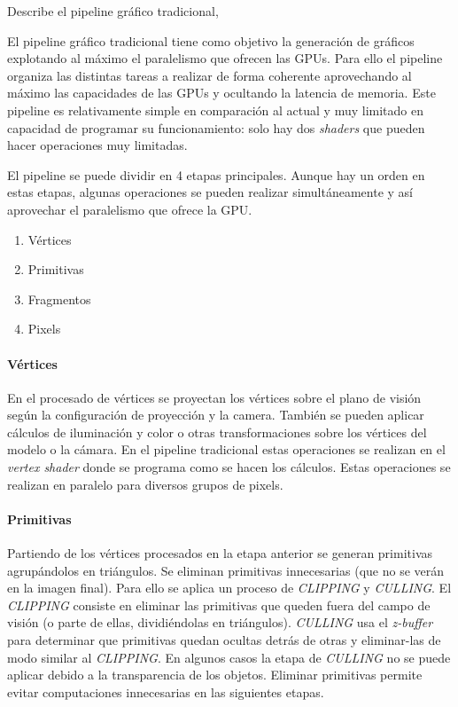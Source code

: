 \begin{pregunta}{Describe el pipeline gráfico tradicional}\sep{}

El pipeline gráfico tradicional tiene como objetivo la generación de gráficos
explotando al máximo el paralelismo que ofrecen las GPUs. Para ello el pipeline
organiza las distintas tareas a realizar de forma coherente aprovechando al
máximo las capacidades de las GPUs y ocultando la latencia de memoria. Este
pipeline es relativamente simple en comparación al actual y muy limitado en
capacidad de programar su funcionamiento: solo hay dos \emph{shaders} que pueden
hacer operaciones muy limitadas.

El pipeline se puede dividir en 4 etapas principales. Aunque hay un orden en
estas etapas, algunas operaciones se pueden realizar simultáneamente y así
aprovechar el paralelismo que ofrece la GPU.

\begin{enumerate}
    \item Vértices
    \item Primitivas
    \item Fragmentos
    \item Pixels
\end{enumerate}

\paragraph{Vértices} En el procesado de vértices se proyectan los vértices sobre
el plano de visión según la configuración de proyección y la camera. También se
pueden aplicar cálculos de iluminación y color o otras transformaciones
sobre los vértices del modelo o la cámara. En el pipeline tradicional estas
operaciones se realizan en el \emph{vertex shader} donde se programa como se
hacen los cálculos. Estas operaciones se realizan en paralelo para diversos
grupos de pixels.

\paragraph{Primitivas} Partiendo de los vértices procesados en la etapa anterior
se generan primitivas agrupándolos en triángulos. Se eliminan primitivas
innecesarias (que no se verán en la imagen final). Para ello se aplica un
proceso de \emph{CLIPPING} y \emph{CULLING}. El \emph{CLIPPING} consiste en
eliminar las primitivas que queden fuera del campo de visión (o parte de ellas,
dividiéndolas en triángulos). \emph{CULLING} usa el \emph{z-buffer} para
determinar que primitivas quedan ocultas detrás de otras y eliminar-las de modo
similar al \emph{CLIPPING}. En algunos casos la etapa de \emph{CULLING} no se
puede aplicar debido a la transparencia de los objetos. Eliminar primitivas
permite evitar computaciones innecesarias en las siguientes etapas.


\end{pregunta}
